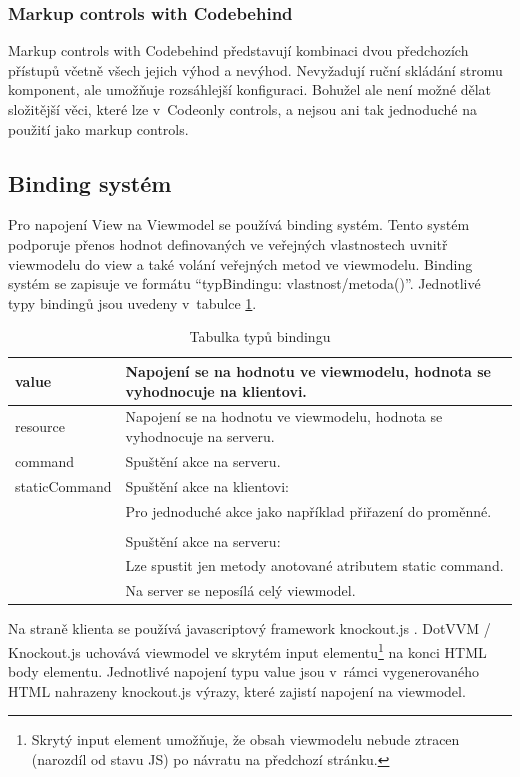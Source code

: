  \subsubsection{Markup controls with Codebehind}
 Markup controls with Codebehind představují kombinaci dvou předchozích přístupů včetně všech jejich výhod a nevýhod. Nevyžadují ruční skládání stromu komponent, ale umožňuje rozsáhlejší konfiguraci. Bohužel ale není možné dělat složitější věci, které lze v~Codeonly controls, a nejsou ani tak jednoduché na použití jako markup controls.
 
\subsection*{Binding systém}
\label{DotVVMBinding}
Pro napojení View na Viewmodel se používá binding systém. Tento systém podporuje přenos hodnot definovaných ve veřejných vlastnostech uvnitř viewmodelu do view a také volání veřejných metod ve viewmodelu.
Binding systém se zapisuje ve formátu “{typBindingu: vlastnost/metoda()}”\cite{DotVVM-Binding}. Jednotlivé typy bindingů jsou uvedeny v~tabulce \ref{tab: Tabulka typů bindingu}.

\begin{table}[H]
	\caption{Tabulka typů bindingu} 
	\centering
	\begin{tabular}{m{8em}|m{30em}}
		\toprule
		value & Napojení se na hodnotu ve viewmodelu, hodnota se vyhodnocuje na klientovi.\\ \midrule
		resource & Napojení se na hodnotu ve viewmodelu, hodnota se vyhodnocuje na serveru.\\ \midrule
		command & Spuštění akce na serveru.\\ \midrule
		staticCommand & Spuštění akce na klientovi: \\
		& Pro jednoduché akce jako například přiřazení do proměnné. \\\\
		& Spuštění akce na serveru: \\
		& Lze spustit jen metody anotované atributem static command. \\
		& Na server se neposílá celý viewmodel. \\

		\bottomrule
	\end{tabular}
	\label{tab: Tabulka typů bindingu}
\end{table}

Na straně klienta se používá javascriptový framework knockout.js . DotVVM / Knockout.js uchovává viewmodel ve skrytém input elementu\footnote{Skrytý input element umožňuje, že obsah viewmodelu nebude ztracen (narozdíl od stavu JS) po návratu na předchozí stránku.} na konci HTML body elementu. Jednotlivé napojení typu value jsou v~rámci vygenerovaného HTML nahrazeny knockout.js výrazy, které zajistí napojení na viewmodel.


